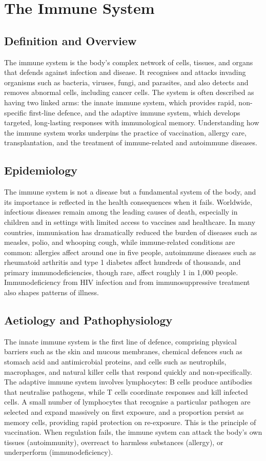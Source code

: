 \chapter{The Immune System}

\section*{Definition and Overview}
The immune system is the body's complex network of cells, tissues, and organs that defends against infection and disease. It recognises and attacks invading organisms such as bacteria, viruses, fungi, and parasites, and also detects and removes abnormal cells, including cancer cells. The system is often described as having two linked arms: the innate immune system, which provides rapid, non-specific first-line defence, and the adaptive immune system, which develops targeted, long-lasting responses with immunological memory. Understanding how the immune system works underpins the practice of vaccination, allergy care, transplantation, and the treatment of immune-related and autoimmune diseases.

\section*{Epidemiology}
The immune system is not a disease but a fundamental system of the body, and its importance is reflected in the health consequences when it fails. Worldwide, infectious diseases remain among the leading causes of death, especially in children and in settings with limited access to vaccines and healthcare. In many countries, immunisation has dramatically reduced the burden of diseases such as measles, polio, and whooping cough, while immune-related conditions are common: allergies affect around one in five people, autoimmune diseases such as rheumatoid arthritis and type 1 diabetes affect hundreds of thousands, and primary immunodeficiencies, though rare, affect roughly 1 in 1,000 people. Immunodeficiency from HIV infection and from immunosuppressive treatment also shapes patterns of illness.

\section*{Aetiology and Pathophysiology}
The innate immune system is the first line of defence, comprising physical barriers such as the skin and mucous membranes, chemical defences such as stomach acid and antimicrobial proteins, and cells such as neutrophils, macrophages, and natural killer cells that respond quickly and non-specifically. The adaptive immune system involves lymphocytes: B cells produce antibodies that neutralise pathogens, while T cells coordinate responses and kill infected cells. A small number of lymphocytes that recognise a particular pathogen are selected and expand massively on first exposure, and a proportion persist as memory cells, providing rapid protection on re-exposure. This is the principle of vaccination. When regulation fails, the immune system can attack the body's own tissues (autoimmunity), overreact to harmless substances (allergy), or underperform (immunodeficiency).

